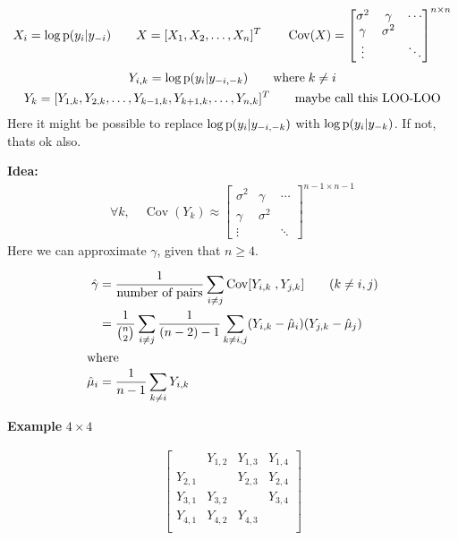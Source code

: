 \documentclass[a4paper, fleqn]{article}
\let\originalleft\left
\let\originalright\right
\renewcommand{\left}{\mathopen{}\mathclose\bgroup\originalleft}
\renewcommand{\right}{\aftergroup\egroup\originalright}
\begin{document}
\begin{gather}
X_i = \log \operatorname{p}\left( y_i \middle| y_{-i} \right) \qquad
X = [X_1, X_2, \dots, X_n]^T \qquad
\operatorname{Cov}(X) =
\begin{bmatrix}
    \sigma^2 & \gamma   &  \cdots \\
    \gamma   & \sigma^2 &  \\
    \vdots    &          & \ddots
\end{bmatrix}^{n \times n}
\end{gather}
\begin{gather}
Y_{i,k} = \log \operatorname{p}\left( y_i \middle| y_{-i,-k} \right) \qquad \text{where} \; k \neq i\\
Y_k = [Y_{1,k}, Y_{2,k}, \dots, Y_{k-1,k}, Y_{k+1,k}, \dots, Y_{n,k}]^T
\qquad \text{maybe call this LOO-LOO}
\end{gather}
Here it might be possible to replace $\log \operatorname{p}\left( y_i \middle| y_{-i,-k} \right)$ with $\log \operatorname{p}\left( y_i \middle| y_{-k} \right)$.
If not, thats ok also.

\textbf{Idea:}
\begin{gather}
\forall k, \quad \operatorname{Cov}(Y_k) \approx
\begin{bmatrix}
    \sigma^2 & \gamma   &  \cdots \\
    \gamma   & \sigma^2 &  \\
    \vdots    &          & \ddots
\end{bmatrix}^{n-1 \times n-1}
\end{gather}
Here we can approximate $\gamma$, given that $n \geq 4$.

\begin{align}
\hat{\gamma}
&= \frac{1}{\text{number of pairs}} \sum_{i \neq j}
\operatorname{Cov}\left[ Y_{i,k} \; , Y_{j,k} \right]
\qquad (k \neq i,j) \\
&= \frac{1}{\binom{n}{2}} \sum_{i \neq j}
\frac{1}{(n-2)-1} \sum_{k \neq i,j}
\left( Y_{i,k} - \hat{\mu}_i \right)
\left( Y_{j,k} - \hat{\mu}_j \right) \\
\intertext{where}
\hat{\mu}_i &= \frac{1}{n-1}\sum_{k\neq i}Y_{i,k}
\end{align}

\textbf{Example} $4 \times 4$

\begin{gather}
\begin{bmatrix}
            & Y_{1,2} & Y_{1,3} & Y_{1,4} \\
    Y_{2,1} &         & Y_{2,3} & Y_{2,4} \\
    Y_{3,1} & Y_{3,2} &         & Y_{3,4} \\
    Y_{4,1} & Y_{4,2} & Y_{4,3} &         \\
\end{bmatrix}
\end{gather}
\end{document}
